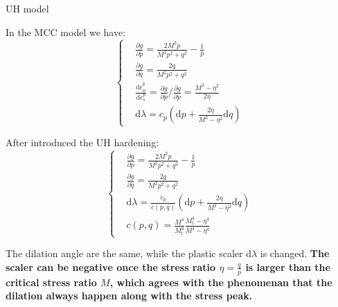 \documentclass[aspectratio=169]{beamer}
\begin{document}
\begin{frame}{UH model}
    \fontsize{10}{9}\selectfont
    \begin{minipage}[c]{0.48\linewidth}
        In the MCC model we have:
    \begin{equation}
        \left\{
            \begin{aligned}
                    &\frac{\partial g}{\partial p} = \frac{2M^2p}{M^2p^2+q^2}-\frac{1}{p}\\
                    &\frac{\partial g}{\partial q} = \frac{2q}{M^2p^2+q^2}\\
                    &\frac{\mathrm{d}\epsilon_{ii}^p}{\mathrm{d}\epsilon_{s}^p} = \frac{\partial g}{\partial p}/\frac{\partial g}{\partial p} = \frac{M^2-\eta^2}{2\eta}\\
                    &\mathrm{d} \lambda = c_p \left( \mathrm{d} p + \frac{2\eta}{M^2-\eta^2}\mathrm{d}q\right)
            \end{aligned}
        \right.
        \label{eq: plastic direction in the MCC model}
    \end{equation}
    \end{minipage}
    \vspace{2mm}
    \begin{minipage}[c]{0.50\linewidth}
        After introduced the UH hardening:
        \begin{equation}
        \left\{
            \begin{aligned}
                    &\frac{\partial g}{\partial p} = \frac{2M^2p}{M^2p^2+q^2}-\frac{1}{p}\\
                    &\frac{\partial g}{\partial q} = \frac{2q}{M^2p^2+q^2}\\
                    &\mathrm{d} \lambda = \frac{c_p}{c(p, q)}  \left(\mathrm{d}p+\frac{2\eta}{M^2-\eta^2}\mathrm{d}q\right)\\
                    &c\left(p, q\right)=\frac{M^{4}}{M_{\mathrm{f}}^{4}} \frac{M_{\mathrm{f}}^{4}-\eta^{4}}{M^{4}-\eta^{4}}
            \end{aligned}
        \right.
        \label{eq: plastic direction in the UH model}
    \end{equation}
    \end{minipage}
    
    The dilation angle are the same, while the plastic scaler $\mathrm{d} \lambda$ is changed. \textbf{The scaler can be negative once the stress ratio $\eta = \frac{q}{p}$ is larger than the critical stress ratio $M$, which agrees with the phenomenan that the dilation always happen along with the stress peak.}
\end{frame}
\end{document}
